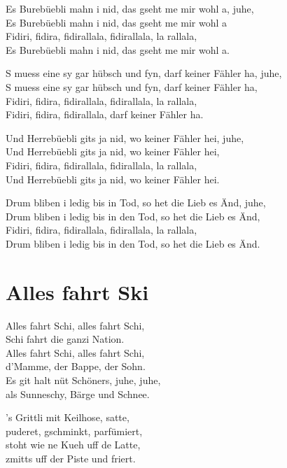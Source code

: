 \documentclass[
  letterpaper,
  twoside=false]{scrbook}
\begin{document}
Es Burebüebli mahn i nid, das gseht me mir wohl a, juhe,\\
Es Burebüebli mahn i nid, das gseht me mir wohl a\\
Fidiri, fidira, fidirallala, fidirallala, la rallala,\\
Es Burebüebli mahn i nid, das gseht me mir wohl a.

S muess eine sy gar hübsch und fyn, darf keiner Fähler ha, juhe,\\
S muess eine sy gar hübsch und fyn, darf keiner Fähler ha,\\
Fidiri, fidira, fidirallala, fidirallala, la rallala,\\
Fidiri, fidira, fidirallala, darf keiner Fähler ha.

Und Herrebüebli git\textquotesingle s ja nid, wo keiner Fähler hei,
juhe,\\
Und Herrebüebli git\textquotesingle s ja nid, wo keiner Fähler hei,\\
Fidiri, fidira, fidirallala, fidirallala, la rallala,\\
Und Herrebüebli git\textquotesingle s ja nid, wo keiner Fähler hei.

Drum bliben i ledig bis in Tod, so het die Lieb es Änd, juhe,\\
Drum bliben i ledig bis in den Tod, so het die Lieb es Änd,\\
Fidiri, fidira, fidirallala, fidirallala, la rallala,\\
Drum bliben i ledig bis in den Tod, so het die Lieb es Änd.

\hypertarget{alles-fahrt-ski}{%
\chapter{Alles fahrt Ski}\label{alles-fahrt-ski}}

Alles fahrt Schi, alles fahrt Schi,\\
Schi fahrt die ganzi Nation.\\
Alles fahrt Schi, alles fahrt Schi,\\
d'Mamme, der Bappe, der Sohn.\\
Es git halt nüt Schöners, juhe, juhe,\\
als Sunneschy, Bärge und Schnee.

's Grittli mit Keilhose, satte,\\
puderet, gschminkt, parfümiert,\\
stoht wie ne Kueh uff de Latte,\\
zmitts uff der Piste und friert.
\end{document}
